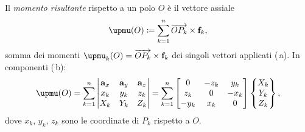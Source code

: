 Il \textit{momento risultante} rispetto a un polo $O$ è il
vettore assiale
\begin{equation}\label{eq:momento_risultante}
	\bm{\upmu}(O) \coloneqq \sum_{k=1}^{n}
	\overrightarrow{OP_k} \times \fb_k,
\end{equation}
somma dei momenti $\bm{\upmu}_k(O) =
\overrightarrow{OP_k} \times \fb_k$ dei singoli vettori
applicati (\,a). In componenti
(\,b):
\begin{equation}\label{eq:momento_risultante_det}
	\bm{\upmu}(O) = \sum_{k=1}^{n}
	\begin{vmatrix}
		\ab_x & \ab_y & \ab_z \\
		x_k   & y_k   & z_k   \\
		X_k   & Y_k   & Z_k
	\end{vmatrix}
	= \sum_{k=1}^{n}
	\begin{bmatrix}
		0    & -z_k &  y_k \\
		z_k  &  0   & -x_k \\
		-y_k &  x_k &  0
	\end{bmatrix}
	\begin{Bmatrix} X_k \\ Y_k \\ Z_k \end{Bmatrix},
\end{equation}
dove $x_k$, $y_k$, $z_k$ sono le coordinate di $P_k$
rispetto a $O$.


